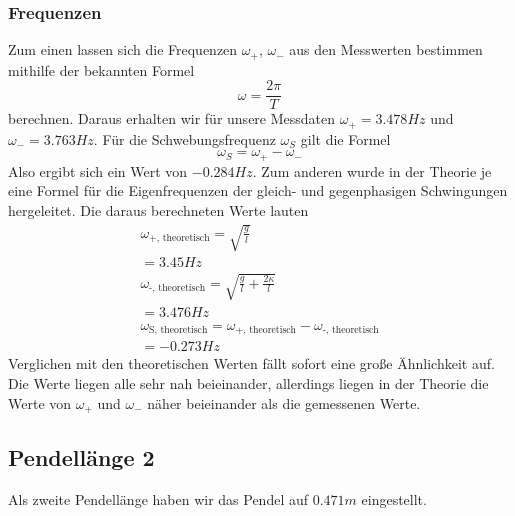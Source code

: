 \subsubsection{Frequenzen}
Zum einen lassen sich die Frequenzen $\omega_{+}$, $\omega_{-}$ aus den Messwerten bestimmen mithilfe der bekannten Formel
\begin{equation}
\omega = \frac{2 \pi}{T}
\end{equation}
berechnen. Daraus erhalten wir für unsere Messdaten $\omega_{+} = 3.478Hz$ und $\omega_{-} = 3.763Hz$. Für die Schwebungsfrequenz $\omega_{S}$ gilt die Formel
\begin{equation}
\omega_{S} = \omega_{+} - \omega_{-}
\end{equation}
Also ergibt sich ein Wert von $-0.284 Hz$. 
Zum anderen wurde in der Theorie je eine Formel für die Eigenfrequenzen 
der gleich- und gegenphasigen Schwingungen hergeleitet. Die daraus berechneten Werte lauten
\begin{align}
\omega_\text{+, theoretisch} = \sqrt{\frac{g}{l}}\\
    = 3.45Hz\\
\omega_\text{-, theoretisch} = \sqrt{\frac{g}{l} + \frac{2 \kappa}{l}}\\
    = 3.476Hz\\
\omega_\text{S, theoretisch} = \omega_\text{+, theoretisch} - \omega_\text{-, theoretisch}\\
    = -0.273Hz
\end{align}
Verglichen mit den theoretischen Werten fällt sofort eine große Ähnlichkeit auf. Die Werte liegen alle sehr nah beieinander, allerdings liegen in der Theorie die
Werte von $\omega_{+}$ und $\omega_{-}$ näher beieinander als die gemessenen Werte.



\subsection{Pendellänge 2}
Als zweite Pendellänge haben wir das Pendel auf $0.471 m$ eingestellt.
